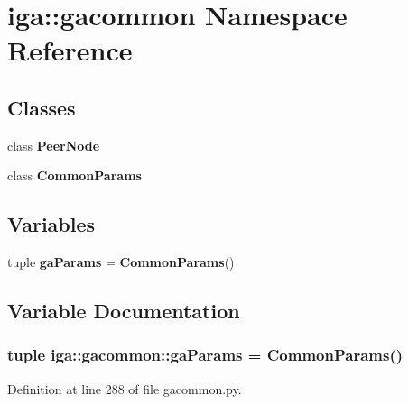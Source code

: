 \section{iga::gacommon Namespace Reference}
\label{namespaceiga_1_1gacommon}


\subsection*{Classes}
\begin{CompactItemize}
\item 
class {\bf PeerNode}
\item 
class {\bf CommonParams}
\end{CompactItemize}
\subsection*{Variables}
\begin{CompactItemize}
\item 
tuple {\bf gaParams} = {\bf CommonParams}()
\end{CompactItemize}


\subsection{Variable Documentation}
\subsubsection{\setlength{\rightskip}{0pt plus 5cm}tuple {\bf iga::gacommon::gaParams} = {\bf CommonParams}()\hspace{0.3cm}{\tt  [static]}}\label{namespaceiga_1_1gacommon_37269f5cd92232a46e7d82716aa3daf6}




Definition at line 288 of file gacommon.py.